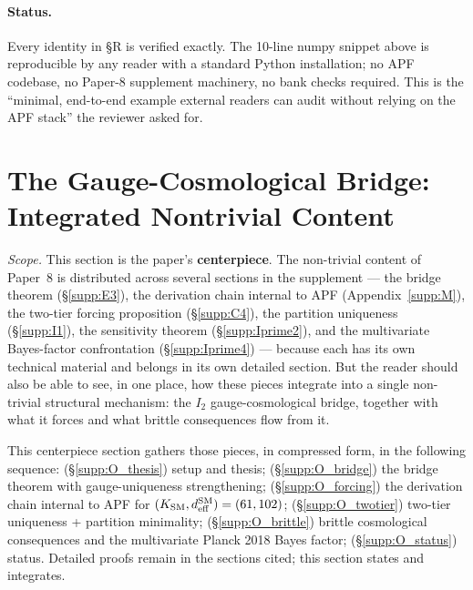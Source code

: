 \documentclass[11pt]{article}
\theoremstyle{plain}
\theoremstyle{definition}
\theoremstyle{remark}
\begin{document}
\paragraph{Status.}  Every identity in §R is verified exactly.  The 10-line numpy snippet above is reproducible by any reader with a standard Python installation; no APF codebase, no Paper-8 supplement machinery, no bank checks required.  This is the ``minimal, end-to-end example external readers can audit without relying on the APF stack'' the reviewer asked for.

\section{The Gauge-Cosmological Bridge: Integrated Nontrivial Content}\label{supp:O}

\noindent\textit{Scope.}  This section is the paper's \textbf{centerpiece}.  The non-trivial content of Paper~8 is distributed across several sections in the supplement --- the bridge theorem (\S\ref{supp:E3}), the derivation chain internal to APF (Appendix~\ref{supp:M}), the two-tier forcing proposition (\S\ref{supp:C4}), the partition uniqueness (\S\ref{supp:I1}), the sensitivity theorem (\S\ref{supp:Iprime2}), and the multivariate Bayes-factor confrontation (\S\ref{supp:Iprime4}) --- because each has its own technical material and belongs in its own detailed section.  But the reader should also be able to see, in one place, how these pieces integrate into a single non-trivial structural mechanism: the $I_2$ gauge-cosmological bridge, together with what it forces and what brittle consequences flow from it.

This centerpiece section gathers those pieces, in compressed form, in the following sequence: (§\ref{supp:O_thesis}) setup and thesis; (§\ref{supp:O_bridge}) the bridge theorem with gauge-uniqueness strengthening; (§\ref{supp:O_forcing}) the derivation chain internal to APF for $(K_{\rm SM}, d_{\rm eff}^{\rm SM}) = (61, 102)$; (§\ref{supp:O_twotier}) two-tier uniqueness + partition minimality; (§\ref{supp:O_brittle}) brittle cosmological consequences and the multivariate Planck 2018 Bayes factor; (§\ref{supp:O_status}) status.  Detailed proofs remain in the sections cited; this section states and integrates.

\bigskip
\end{document}

